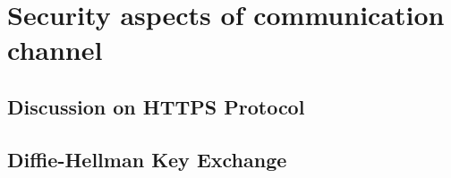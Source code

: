 \chapter{Security aspects of communication channel}\label{ch:security-aspects-of-communication-channel}


\section{Discussion on HTTPS Protocol}\label{sec:discussion-on-https-protocol}



\section{Diffie-Hellman Key Exchange}\label{sec:diffie-hellman-key-exchange}


%